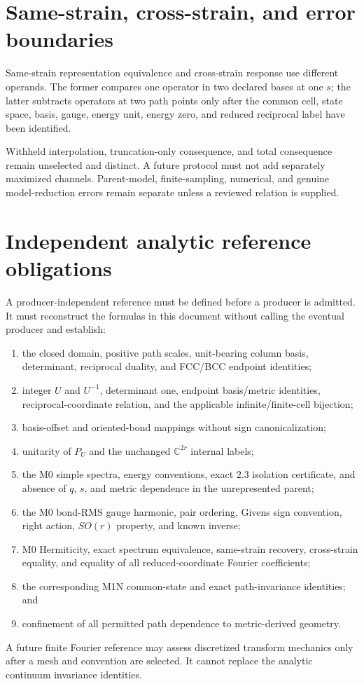 \documentclass[11pt]{article}
\newcommand{\CC}{\mathbb C}
\begin{document}
\section{Same-strain, cross-strain, and error boundaries}

Same-strain representation equivalence and cross-strain response use different operands.
The former compares one operator in two declared bases at one $s$; the latter subtracts
operators at two path points only after the common cell, state space, basis, gauge,
energy unit, energy zero, and reduced reciprocal label have been identified.

Withheld interpolation, truncation-only consequence, and total consequence remain
unselected and distinct.  A future protocol must not add separately maximized channels.
Parent-model, finite-sampling, numerical, and genuine model-reduction errors remain
separate unless a reviewed relation is supplied.

\section{Independent analytic reference obligations}

A producer-independent reference must be defined before a producer is admitted.  It
must reconstruct the formulas in this document without calling the eventual producer
and establish:
\begin{enumerate}[leftmargin=*]
  \item the closed domain, positive path scales, unit-bearing column basis, determinant,
    reciprocal duality, and FCC/BCC endpoint identities;
  \item integer $U$ and $U^{-1}$, determinant one, endpoint basis/metric identities,
    reciprocal-coordinate relation, and the applicable infinite/finite-cell bijection;
  \item basis-offset and oriented-bond mappings without sign canonicalization;
  \item unitarity of $P_U$ and the unchanged $\CC^{2r}$ internal labels;
  \item the M0 simple spectra, energy conventions, exact $2.3$ isolation certificate,
    and absence of $q$, $s$, and metric dependence in the unrepresented parent;
  \item the M0 bond-RMS gauge harmonic, pair ordering, Givens sign convention, right
    action, $SO(r)$ property, and known inverse;
  \item M0 Hermiticity, exact spectrum equivalence, same-strain recovery, cross-strain
    equality, and equality of all reduced-coordinate Fourier coefficients;
  \item the corresponding M1N common-state and exact path-invariance identities; and
  \item confinement of all permitted path dependence to metric-derived geometry.
\end{enumerate}
A future finite Fourier reference may assess discretized transform mechanics only after
a mesh and convention are selected.  It cannot replace the analytic continuum
invariance identities.
\end{document}
